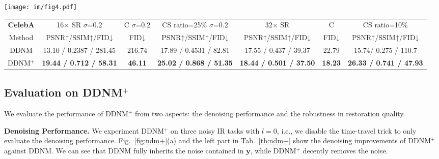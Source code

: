\documentclass{article} \usepackage{iclr2023_conference,times}
\begin{document}
\begin{figure*}[t]
  \centering
  \vspace{-0.5cm}
  \texttt{[image: im/fig4.pdf]}
  \vspace{-0.5cm}
  \caption{DDNM$^+$ improves (a) denoising performance and (b) restoration quality.}
\label{fig:ndm+} 
\end{figure*}
\begin{table*}[t]
    \centering
    \scriptsize
    \begin{tabular}{c|ccc|ccc}
        \hline
           \multicolumn{1}{c}{\rule{0pt}{10pt}\textbf{CelebA}}&\multicolumn{1}{|c}{{16$\times$ SR $\sigma$=0.2}} &\multicolumn{1}{c}{C $\sigma$=0.2}&\multicolumn{1}{c}{CS ratio=25\% $\sigma$=0.2}&\multicolumn{1}{|c}{{32$\times$ SR}} &\multicolumn{1}{c}{C}&\multicolumn{1}{c}{CS ratio=10\%}\\
           \rule{0pt}{10pt}Method& PSNR↑/SSIM↑/FID↓ &  FID↓&  PSNR↑/SSIM↑/FID↓& PSNR↑/SSIM↑/FID↓ &  FID↓&  PSNR↑/SSIM↑/FID↓\\
        \hline
            \rule{0pt}{10pt}{DDNM} &13.10 / 0.2387 / 281.45& 216.74
            &17.89 / 0.4531 / 82.81&17.55 / 0.437 / 39.37&22.79&15.74/ 0.275 / 110.7
            \\   
            \rule{0pt}{10pt}{DDNM$^+$} &\textbf{19.44 / 0.712 / 58.31 }& \textbf{46.11}
            &\textbf{25.02 / 0.868 / 51.35} &\textbf{18.44 / 0.501 / 37.50}& \textbf{18.23}&\textbf{26.33 / 0.741 / 47.93}
            \\
        \hline
    \end{tabular}
    \caption{Ablation study on denoising improvements (\textit{left}) and the time-travel trick (\textit{right}). C represents the colorization task. $\sigma$ denotes the noise variance on $\mathbf{y}$.
    }
    \vspace{-0.2cm}
    \label{tb:ndm+}
\end{table*}

\vspace{-0.2cm}
\subsection{Evaluation on DDNM$^+$}
We evaluate the performance of DDNM$^+$ from two aspects: the denoising performance and the robustness in restoration quality.

\textbf{Denoising Performance.} We experiment DDNM$^+$ on three noisy IR tasks with $l=0$, i.e., we disable the time-travel trick to only evaluate the denoising performance. Fig.~\ref{fig:ndm+}(a) and the left part in Tab.~\ref{tb:ndm+} show the denoising improvements of DDNM$^+$ against DDNM. We can see that DDNM fully inherits the noise contained in $\mathbf{y}$, while DDNM$^+$ decently removes the noise.
\end{document}
